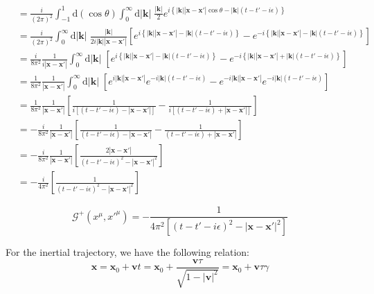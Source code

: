 \documentclass[12pt]{article}
\numberwithin{equation}{section}
\theoremstyle{1style}
\newcommand{\id}{\mathrm{d}}
\begin{document}
\begin{align}
   &=\frac{i}{(2\pi)^2}\int_{-1}^{1}\id(\cos\theta)\int_{0}^{\infty}\id|\mathbf{k}|\;\frac{|\mathbf{k}|}{2}
   e^{i \left\{ \left|\mathbf{k}\right| \left|\mathbf{x}-\mathbf{x'}\right| \cos\theta - |\mathbf{k}|(t-t'-i\epsilon)\right\}}\\
   &=\frac{i}{(2\pi)^2}\int_{0}^{\infty}\id|\mathbf{k}|\;\frac{|\mathbf{k}|}{2i\left|\mathbf{k}\right| \left|\mathbf{x}-\mathbf{x'}\right|}\left[
   e^{i \left\{ \left|\mathbf{k}\right| \left|\mathbf{x}-\mathbf{x'}\right|  - |\mathbf{k}|(t-t'-i\epsilon)\right\}}-
   e^{-i \left\{ \left|\mathbf{k}\right| \left|\mathbf{x}-\mathbf{x'}\right|  - |\mathbf{k}|(t-t'-i\epsilon)\right\}}\right]\\
   &=\frac{i}{8\pi^2}\frac{1}{i|\mathbf{x}-\mathbf{x'}|}\int_{0}^{\infty}\id|\mathbf{k}|\;\left[
   e^{i \left\{ \left|\mathbf{k}\right| \left|\mathbf{x}-\mathbf{x'}\right|  - |\mathbf{k}|(t-t'-i\epsilon)\right\}}-
   e^{-i \left\{\left|\mathbf{k}\right| \left|\mathbf{x}-\mathbf{x'}\right|  + |\mathbf{k}|(t-t'-i\epsilon)\right\}}\right]\\
   &=\frac{1}{8\pi^2}\frac{1}{|\mathbf{x}-\mathbf{x'}|}\int_{0}^{\infty}\id|\mathbf{k}|\;\left[
   e^{i  \left|\mathbf{k}\right| \left|\mathbf{x}-\mathbf{x'}\right| }e^{-i|\mathbf{k}|(t-t'-i\epsilon)}-
   e^{-i \left|\mathbf{k}\right| \left|\mathbf{x}-\mathbf{x'}\right|}e^{-i|\mathbf{k}|(t-t'-i\epsilon)}\right]\\
   &=\frac{1}{8\pi^2}\frac{1}{|\mathbf{x}-\mathbf{x'}|}\left[\frac{1}{i\left[(t-t'-i\epsilon)-|\mathbf{x}-\mathbf{x'}|\right]}-\frac{1}{i\left[(t-t'-i\epsilon)+|\mathbf{x}-\mathbf{x'}|\right]}\right]\\
   &=-\frac{i}{8\pi^2}\frac{1}{|\mathbf{x}-\mathbf{x'}|}\left[\frac{1}{(t-t'-i\epsilon)-|\mathbf{x}-\mathbf{x'}|}-\frac{1}{(t-t'-i\epsilon)+|\mathbf{x}-\mathbf{x'}|}\right]\\
   &=-\frac{i}{8\pi^2}\frac{1}{|\mathbf{x}-\mathbf{x'}|}\left[\frac{2|\mathbf{x}-\mathbf{x'}|}{(t-t'-i\epsilon)^2-|\mathbf{x}-\mathbf{x'}|^2}\right]\\
   &=-\frac{i}{4\pi^2}\left[\frac{1}{(t-t'-i\epsilon)^2-|\mathbf{x}-\mathbf{x'}|^2}\right]
\end{align}

\begin{equation}
  \mathcal{G}^+(x^{\mu},x'^{\mu})=-\frac{1}{4\pi^2\left[(t-t'-i\epsilon)^2-|\mathbf{x}-\mathbf{x'}|^2\right]}
\end{equation}

For the inertial trajectory, we have the following relation:
\begin{equation}
  \mathbf{x}=\mathbf{x}_0+\mathbf{v}t=\mathbf{x}_0+\frac{\mathbf{v}\tau}{\sqrt{1-|\mathbf{v}|^2}}=
  \mathbf{x}_0+\mathbf{v}\tau\gamma
\end{equation}
\end{document}
